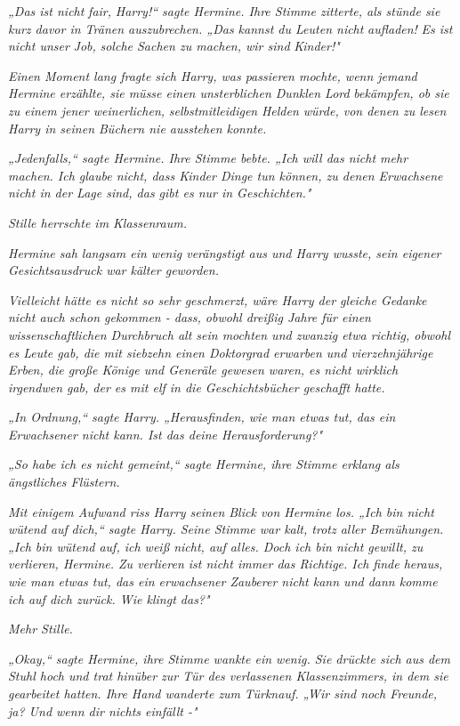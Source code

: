 {\emph{„Das ist nicht} \emph{\emph{fair,}} \emph{Harry!“ sagte Hermine. Ihre Stimme zitterte, als stünde sie kurz davor in Tränen auszubrechen. „Das kannst du Leuten nicht} \emph{\emph{aufladen!}} \emph{Es ist nicht unser} \emph{\emph{Job,}} \emph{solche Sachen zu machen, wir sind} \emph{\emph{Kinder!}"}

\emph{Einen Moment lang fragte sich Harry, was passieren mochte, wenn jemand Hermine erzählte, sie müsse einen unsterblichen Dunklen Lord} \emph{bekämpfen, ob sie zu einem jener weinerlichen,} \emph{selbstmitleidigen} \emph{Helden würde, von denen zu lesen Harry in seinen Büchern nie ausstehen konnte.}

\emph{„Jedenfalls,“ sagte Hermine. Ihre Stimme bebte. „Ich will das nicht mehr machen. Ich glaube nicht, dass Kinder Dinge tun können, zu denen Erwachsene nicht in der Lage sind, das gibt es nur in Geschichten."}

\emph{Stille herrschte im Klassenraum.}

\emph{Hermine sah langsam ein wenig verängstigt aus und Harry wusste, sein eigener Gesichtsausdruck war kälter geworden.}

\emph{Vielleicht hätte es nicht so sehr geschmerzt, wäre Harry der gleiche Gedanke nicht auch schon gekommen - dass, obwohl dreißig Jahre für einen wissenschaftlichen Durchbruch alt sein mochten und zwanzig etwa richtig, obwohl es Leute gab, die mit siebzehn einen Doktorgrad erwarben und vierzehnjährige Erben, die große Könige und Generäle gewesen waren, es nicht wirklich irgendwen gab, der es mit elf in die Geschichtsbücher geschafft hatte.}

\emph{„In Ordnung,“ sagte Harry. „Herausfinden, wie man etwas tut, das ein Erwachsener nicht kann. Ist das deine Herausforderung?"}

\emph{„So habe ich es nicht gemeint,“ sagte Hermine, ihre Stimme erklang als ängstliches Flüstern.}

\emph{Mit einigem Aufwand riss Harry seinen Blick von Hermine los. „Ich bin nicht wütend auf} \emph{\emph{dich,}“ sagte Harry. Seine Stimme war kalt, trotz aller Bemühungen. „Ich bin wütend auf, ich weiß nicht, auf alles. Doch ich bin nicht gewillt, zu verlieren, Hermine. Zu verlieren ist nicht immer das Richtige. Ich finde heraus, wie man etwas tut, das ein erwachsener Zauberer nicht kann und dann komme ich auf dich zurück. Wie klingt das?"}

\emph{Mehr Stille.}

\emph{„Okay,“ sagte Hermine, ihre Stimme wankte ein wenig. Sie drückte sich aus dem Stuhl hoch und trat hinüber zur Tür des verlassenen Klassenzimmers, in dem sie gearbeitet hatten. Ihre Hand wanderte zum} \emph{Türknauf. „Wir sind noch Freunde, ja? Und wenn dir nichts einfällt -"}

}
